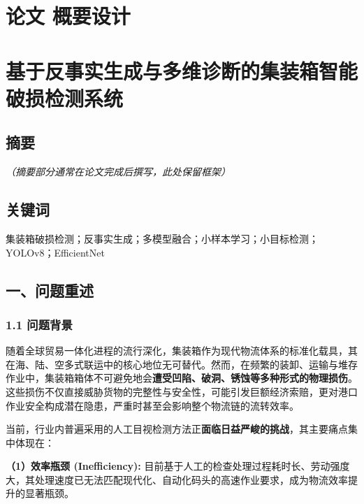 \documentclass[
]{article}
\author{}
\date{}
\begin{document}
\section{论文 概要设计}\label{ux8bbaux6587-ux6982ux8981ux8bbeux8ba1}

\section{基于反事实生成与多维诊断的集装箱智能破损检测系统}\label{ux57faux4e8eux53cdux4e8bux5b9eux751fux6210ux4e0eux591aux7ef4ux8bcaux65adux7684ux96c6ux88c5ux7bb1ux667aux80fdux7834ux635fux68c0ux6d4bux7cfbux7edf}

\subsection{摘要}\label{ux6458ux8981}

\emph{（摘要部分通常在论文完成后撰写，此处保留框架）}

\subsection{关键词}\label{ux5173ux952eux8bcd}

集装箱破损检测；反事实生成；多模型融合；小样本学习；小目标检测；YOLOv8；EfficientNet

\subsection{一、问题重述}\label{ux4e00ux95eeux9898ux91cdux8ff0}

\subsubsection{1.1 问题背景}\label{11-ux95eeux9898ux80ccux666f}

随着全球贸易一体化进程的流行深化，集装箱作为现代物流体系的标准化载具，其在海、陆、空多式联运中的核心地位无可替代。然而，在频繁的装卸、运输与堆存作业中，集装箱箱体不可避免地会\textbf{遭受凹陷、破洞、锈蚀等多种形式的物理损伤}。这些损伤不仅直接威胁货物的完整性与安全性，可能引发巨额经济索赔，更对港口作业安全构成潜在隐患，严重时甚至会影响整个物流链的流转效率。

当前，行业内普遍采用的人工目视检测方法正\textbf{面临日益严峻的挑战}，其主要痛点集中体现在：

\textbf{（1）效率瓶颈 (Inefficiency):}
目前基于人工的检查处理过程耗时长、劳动强度大，其处理速度已无法匹配现代化、自动化码头的高速作业要求，成为物流效率提升的显著瓶颈。
\end{document}
